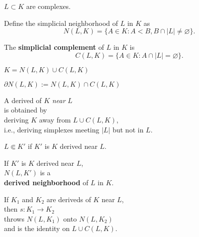 \documentclass[14pt]{beamer}
\newcommand{\fullsubcomplex}{\Subset}
\begin{document}
\begin{frame}
  $L \subset K$ are complexes.

  \vfill

  Define the simplicial neighborhood of $L$ in $K$ as
  $$N(L,K) = \{ A \in K : A < B, B \cap |L| \neq \varnothing \}.$$

  \vfill

  The \textbf{simplicial complement} of $L$ in $K$ is
  $$
C(L,K) = \{ A \in K : A \cap |L| = \varnothing \}.
  $$

  \vfill\pause
  $K = N(L,K) \cup C(L,K)$
  
  \vfill\pause
  $\partial N(L,K) := N(L,K) \cap C(L,K)$
\end{frame}

\begin{frame}
  A derived of $K$ \textit{near} $L$ \\
  is obtained by \\
  deriving $K$ away from $L \cup C(L,K)$, \\
  i.e., deriving simplexes meeting $|L|$ but not in $L$.

  \vfill\pause
  $L \fullsubcomplex K'$ if $K'$ is $K$ derived near $L$.

\end{frame}

\begin{frame}
  \vfill
  \begin{center}
    \scalebox{9}{Why?}
  \end{center}
  \vfill
\end{frame}

\begin{frame}
  If $K'$ is $K$ derived near $L$, \\
  $N(L,K')$ is a \\
  \textbf{derived neighborhood} of $L$ in $K$.

  \vfill
  \begin{theorem}
    If $K_1$ and $K_2$ are deriveds of $K$ near $L$, \\
    then $s : K_1 \to K_2$ \\
    throws $N(L,K_1)$ onto $N(L,K_2)$ \\
    and is the identity on $L \cup C(L,K)$.
  \end{theorem}

\end{frame}
\end{document}

